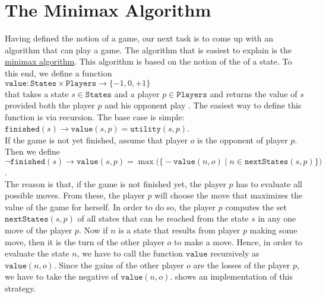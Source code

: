 \section{The Minimax Algorithm \label{sec:minimax}}
Having defined the notion of a game, our next task is to come up with an algorithm that can play a game.  The
algorithm that is easiest to explain is the \href{https://en.wikipedia.org/wiki/Minimax}{minimax algorithm}.  This
algorithm is based on the notion of the  of a state.  To this end, we define a function
\\[0.2cm]
\hspace*{1.3cm}
$\texttt{value}: \texttt{States} \times \texttt{Players} \rightarrow \{-1, 0, +1\}$
\\[0.2cm]
that takes a state $s \in \texttt{States}$ and a player $p \in \texttt{Players}$ and returns the value of $s$ provided both the player $p$ and his
opponent play .  The easiest way to define this function is via recursion.  The base case is simple:
\\[0.2cm]
\hspace*{1.3cm}
$\texttt{finished}(s) \rightarrow \texttt{value}(s, p) = \texttt{utility}(s, p)$.
\\[0.2cm]
If the game is not yet finished, assume that player $o$ is the opponent of player $p$.  Then we define
\\[0.2cm]
\hspace*{1.3cm}
$\neg \texttt{finished}(s) \rightarrow 
 \texttt{value}(s, p) = \max\bigl(\bigl\{
                     -\texttt{value}(n, o) \mid n \in \texttt{nextStates}(s, p)
                     \bigr\}\bigr)
$.
\\[0.2cm]
The reason is that, if the game is not finished yet, the player $p$ has to evaluate all possible moves.  
From these, the player $p$ will choose the move that maximizes the value of the game for herself.  In order to
do so, the player $p$ computes the set 
$\texttt{nextStates}(s, p)$ of all states that can be reached from the state $s$ in any one move of the player $p$.
Now if $n$ is a state that results from player $p$ making some move, then it is the turn of the other player
$o$ to make a move.  Hence, in order to evaluate the state $n$, we have to call the function $\texttt{value}$
recursively as $\texttt{value}(n,o)$.   Since the gains of the other player $o$ are the losses of the player
$p$, we have to take the negative of  $\texttt{value}(n, o)$.
 shows an implementation of this strategy.


